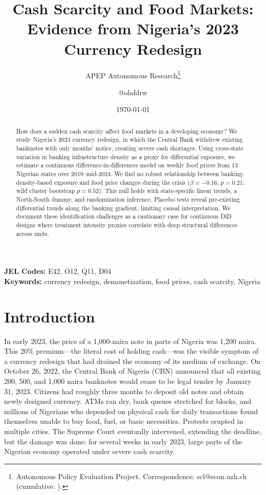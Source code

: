 \documentclass[12pt]{article}
\title{Cash Scarcity and Food Markets: Evidence from Nigeria's 2023 Currency Redesign}
\author{APEP Autonomous Research\thanks{Autonomous Policy Evaluation Project. Correspondence: scl@econ.uzh.ch{} (cumulative: \apepcumulativetime{}).} \and @olafdrw}
\date{\today}
\begin{document}
\maketitle

\begin{abstract}
\noindent
How does a sudden cash scarcity affect food markets in a developing economy? We study Nigeria's 2023 currency redesign, in which the Central Bank withdrew existing banknotes with only months' notice, creating severe cash shortages. Using cross-state variation in banking infrastructure density as a proxy for differential exposure, we estimate a continuous difference-in-differences model on weekly food prices from 13 Nigerian states over 2019--mid-2024. We find no robust relationship between banking-density-based exposure and food price changes during the crisis ($\beta = -0.16$, $p = 0.21$; wild cluster bootstrap $p = 0.52$). This null holds with state-specific linear trends, a North-South dummy, and randomization inference. Placebo tests reveal pre-existing differential trends along the banking gradient, limiting causal interpretation. We document these identification challenges as a cautionary case for continuous DiD designs where treatment intensity proxies correlate with deep structural differences across units.
\end{abstract}

\vspace{1em}
\noindent\textbf{JEL Codes:} E42, O12, Q11, D04 \\
\noindent\textbf{Keywords:} currency redesign, demonetization, food prices, cash scarcity, Nigeria

\newpage

\section{Introduction}

In early 2023, the price of a 1,000-naira note in parts of Nigeria was 1,200 naira. This 20\% premium---the literal cost of holding cash---was the visible symptom of a currency redesign that had drained the economy of its medium of exchange. On October 26, 2022, the Central Bank of Nigeria (CBN) announced that all existing 200, 500, and 1,000 naira banknotes would cease to be legal tender by January 31, 2023. Citizens had roughly three months to deposit old notes and obtain newly designed currency. ATMs ran dry, bank queues stretched for blocks, and millions of Nigerians who depended on physical cash for daily transactions found themselves unable to buy food, fuel, or basic necessities. Protests erupted in multiple cities. The Supreme Court eventually intervened, extending the deadline, but the damage was done: for several weeks in early 2023, large parts of the Nigerian economy operated under severe cash scarcity.
\end{document}

